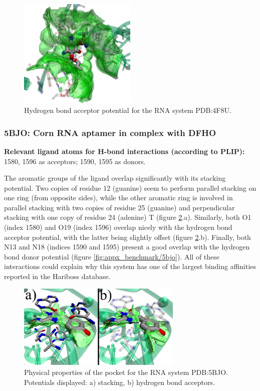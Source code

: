       \begin{figure}[H]
        \centering
        \includegraphics[width=0.5\textwidth]{figures/results/benchmark_rna/4f8u.png}
        \caption{\label{fig:benchmark/4f8u} Hydrogen bond acceptor potential for the RNA system PDB:4F8U.}
      \end{figure}
    \pagebreak

    \subsubsection{5BJO: Corn RNA aptamer in complex with DFHO}
      \textbf{Relevant ligand atoms for H-bond interactions (according to PLIP):} 1580, 1596 as acceptors; 1590, 1595 as donors.

      The aromatic groups of the ligand overlap significantly with its stacking potential. Two copies of residue 12 (guanine) seem to perform parallel stacking on one ring (from opposite sides), while the other aromatic ring is involved in parallel stacking with two copies of residue 25 (guanine) and perpendicular stacking with one copy of residue 24 (adenine) T (figure \ref{fig:benchmark/5bjo}.a). Similarly, both O1 (index 1580) and O19 (index 1596) overlap nicely with the hydrogen bond acceptor potential, with the latter being slightly offset (figure \ref{fig:benchmark/5bjo}.b). Finally, both N13 and N18 (indices 1590 and 1595) present a good overlap with the hydrogen bond donor potential (figure \ref{fig:appx_benchmark/5bjo}). All of these interactions could explain why this system has one of the largest binding affinities reported in the Hariboss database.

      \begin{figure}[H]
        \centering
        \includegraphics[width=0.7\textwidth]{figures/results/benchmark_rna/5bjo.png}
        \caption{\label{fig:benchmark/5bjo} Physical properties of the pocket for the RNA system PDB:5BJO. Potentials displayed: a) stacking, b) hydrogen bond acceptors.}
      \end{figure}
    \pagebreak

